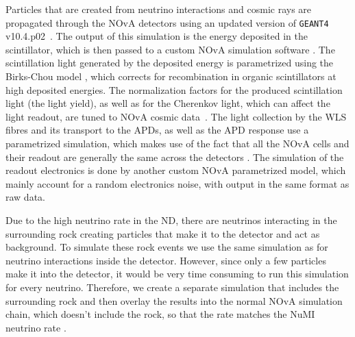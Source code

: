 Particles that are created from neutrino interactions and cosmic rays are propagated through the NOvA detectors using an updated version of \texttt{GEANT4} v10.4.p02~\cite{GEANT4.pdf}. The output of this simulation is the energy deposited in the scintillator, which is then passed to a custom NOvA simulation software \cite{NuMIFlux.pdf}. The scintillation light generated by the deposited energy is parametrized using the Birks-Chou model \cite{BirksChouParametrization_1952.pdf}, which corrects for recombination in organic scintillators at high deposited energies. The normalization factors for the produced scintillation light (the light yield), as well as for the Cherenkov light, which can affect the light readout, are tuned to NOvA cosmic data~\cite{NOvANumuCCXSexMeasurement2023.pdf}. The light collection by the WLS fibres and its transport to the APDs, as well as the APD response use a parametrized simulation, which makes use of the fact that all the NOvA cells and their readout are generally the same across the detectors \cite{NuMIFlux.pdf}. The simulation of the readout electronics is done by another custom NOvA parametrized model, which mainly account for a random electronics noise, with output in the same format as raw data.


Due to the high neutrino rate in the ND, there are neutrinos interacting in the surrounding rock creating particles that make it to the detector and act as background. To simulate these rock events we use the same simulation as for neutrino interactions inside the detector. However, since only a few particles make it into the detector, it would be very time consuming to run this simulation for every neutrino. Therefore, we create a separate simulation that includes the surrounding rock and then overlay the results into the normal NOvA simulation chain, which doesn't include the rock, so that the rate matches the NuMI neutrino rate \cite{NuMIFlux.pdf}.

